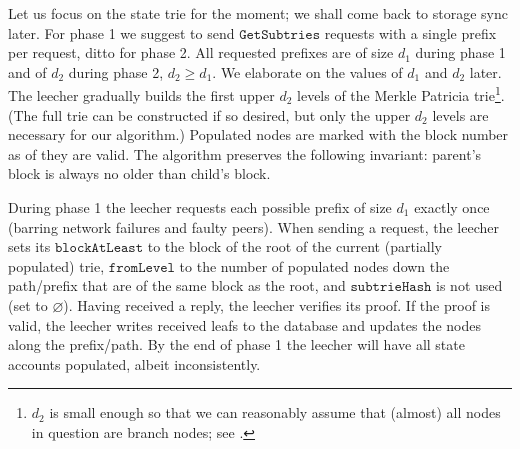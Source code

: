 \documentclass{amsart}
\begin{document}
Let us focus on the state trie for the moment; we shall come back to storage sync later.
For phase 1 we suggest to send $\texttt{GetSubtries}$ requests with a single prefix per request, ditto for phase 2.
All requested prefixes are of size $d_1$ during phase 1 and of $d_2$ during phase 2, $d_2 \geq d_1$.
We elaborate on the values of $d_1$ and $d_2$ later.
The leecher gradually builds the first upper $d_2$ levels of the Merkle Patricia trie\footnote{$d_2$
is small enough so that we can reasonably assume that (almost) all nodes in question are branch nodes;
see \cite{akhunov_1x_workshop_part2}.}.
(The full trie can be constructed if so desired, but only the upper $d_2$ levels are necessary for our algorithm.)
Populated nodes are marked with the block number as of they are valid.
The algorithm preserves the following invariant: parent's block is always no older than child's block.

During phase 1 the leecher requests each possible prefix of size $d_1$ exactly once
(barring network failures and faulty peers).
When sending a request,
the leecher sets its $\texttt{blockAtLeast}$ to the block of the root of the current (partially populated) trie,
$\texttt{fromLevel}$ to the number of populated nodes down the path/prefix that are of the same block as the root,
and $\texttt{subtrieHash}$ is not used (set to $\varnothing$).
Having received a reply, the leecher verifies its proof.
If the proof is valid, the leecher writes received leafs to the database and updates the nodes along the prefix/path.
By the end of phase 1 the leecher will have all state accounts populated, albeit inconsistently.
\end{document}
